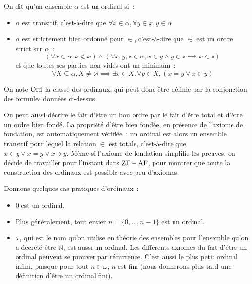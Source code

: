 \begin{definition}
  On dit qu'un ensemble $\alpha$ est un ordinal si~:
  \begin{itemize}
  \item $\alpha$ est transitif, c'est-à-dire que
    $\forall x\in \alpha, \forall y \in x, y\in \alpha$
  \item $\alpha$ est strictement bien ordonné pour $\in$, c'est-à-dire que 
    $\in$ est un ordre strict sur $\alpha$~:
    \[(\forall x\in \alpha, x\notin x)\land (\forall x,y,z\in \alpha,
    x\in y \land y \in z \implies x \in z)\]
    et que toutes ses parties non vides ont un minimum~:
    \[\forall X\subseteq \alpha, X\neq\varnothing\implies
    \exists x \in X, \forall y \in X, (x=y \lor x \in y)\]
  \end{itemize}

  On note $\operatorname{Ord}$ la classe des ordinaux, qui peut donc être définie par la
  conjonction des formules données ci-dessus.
\end{definition}

\begin{remark}
  On peut aussi décrire le fait d'être un bon ordre par le fait d'être total
  et d'être un ordre bien fondé. La propriété d'être bien fondée, en présence
  de l'axiome de fondation, est automatiquement vérifiée~: un ordinal est alors
  un ensemble transitif pour lequel la relation $\in$ est totale,
  c'est-à-dire que $x\in y \lor x = y \lor x\ni y$. Même si l'axiome de
  fondation simplifie les preuves, on décide de travailler pour l'instant dans
  $\operatorname{ZF} - \operatorname{AF}$, pour montrer que toute la construction des ordinaux est possible
  avec peu d'axiomes.
\end{remark}

\begin{example}
  Donnons quelques cas pratiques d'ordinaux~:
  \begin{itemize}
  \item $0$ est un ordinal.
  \item Plus généralement, tout entier $n = \{0,\ldots,n-1\}$ est un ordinal.
  \item $\omega$, qui est le nom qu'on utilise en théorie des ensembles pour
    l'ensemble qu'on a décrété être $\mathbb N$, est aussi un ordinal. Les
    différents axiomes du fait d'être un ordinal peuvent se prouver par
    récurrence. C'est aussi le plus petit ordinal infini, puisque pour tout
    $n\in \omega$, $n$ est fini (nous donnerons plus tard une définition d'être
    un ordinal fini).
  \end{itemize}
\end{example}


